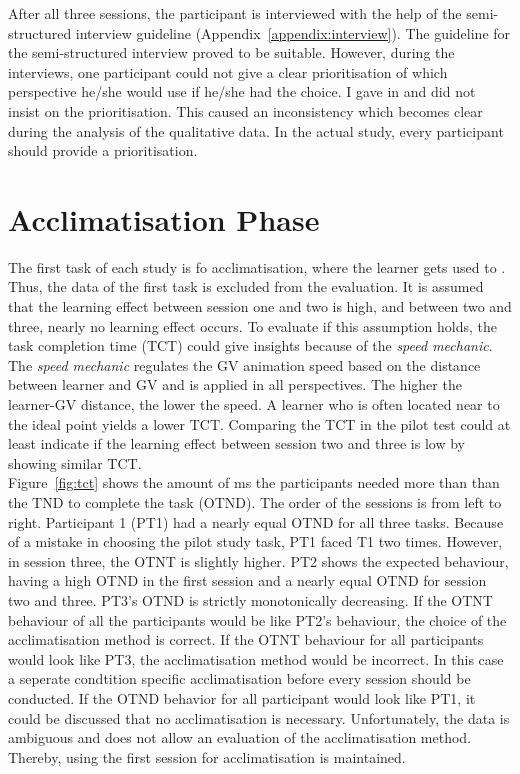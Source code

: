 After all three sessions, the participant is interviewed with the help of the semi-structured interview guideline (Appendix~\ref{appendix:interview}). The guideline for the semi-structured interview proved to be suitable. However, during the interviews, one participant could not give a clear prioritisation of which perspective he/she would use if he/she had the choice. I gave in and did not insist on the prioritisation. This caused an inconsistency which becomes clear during the analysis of the qualitative data. In the actual study, every participant should provide a prioritisation.

\section{Acclimatisation Phase}
\label{sec:evalAccl}
The first task of each study is fo acclimatisation, where the learner gets used to \exgo. Thus, the data of the first task is excluded from the evaluation. It is assumed that the learning effect between session one and two is high, and between two and three, nearly no learning effect occurs. To evaluate if this assumption holds, the task completion time (TCT) could give insights because of the \textit{speed mechanic}. The \textit{speed mechanic} regulates the GV animation speed based on the distance between learner and GV and is applied in all perspectives. The higher the learner-GV distance, the lower the speed. A learner who is often located near to the ideal point yields a lower TCT. Comparing the TCT in the pilot test could at least indicate if the learning effect between session two and three is low by showing similar TCT.\\
Figure~\ref{fig:tct} shows the amount of ms the participants needed more than than the TND to complete the task (OTND). The order of the sessions is from left to right. Participant 1 (PT1) had a nearly equal OTND for all three tasks. Because of a mistake in choosing the pilot study task, PT1 faced T1 two times. However, in session three, the OTNT is slightly higher. PT2 shows the expected behaviour, having a high OTND in the first session and a nearly equal OTND for session two and three. PT3's OTND is strictly monotonically decreasing. If the OTNT behaviour of all the participants would be like PT2's behaviour, the choice of the acclimatisation method is correct. If the OTNT behaviour for all participants would look like PT3, the acclimatisation method would be incorrect. In this case a seperate condtition specific acclimatisation before every session should be conducted. If the OTND behavior for all participant would look like PT1, it could be discussed that no acclimatisation is necessary. Unfortunately, the data is ambiguous and does not allow an evaluation of the acclimatisation method. Thereby, using the first session for acclimatisation is maintained.

